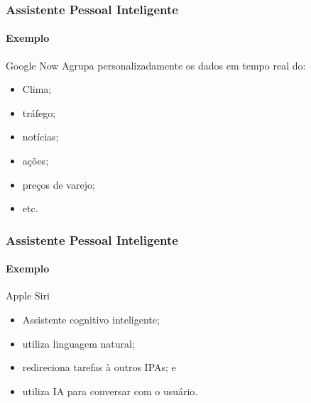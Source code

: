 \documentclass[14pt,beamer]{beamer}
\begin{document}
\begin{frame}
	\frametitle{Assistente Pessoal Inteligente}
    \framesubtitle{Exemplo}

    \begin{block}{Google Now}
        Agrupa personalizadamente os dados em tempo real do:
        \begin{itemize}
            \item Clima;
            \item tráfego;
            \item notícias;
            \item ações;
            \item preços de varejo;
            \item etc.
        \end{itemize}
    \end{block}
\end{frame}

\begin{frame}
	\frametitle{Assistente Pessoal Inteligente}
    \framesubtitle{Exemplo}

    \begin{block}{Apple Siri}
        \begin{itemize}
            \item Assistente cognitivo inteligente;
            \item utiliza linguagem natural;
            \item redireciona tarefas à outros IPAs; e
            \item utiliza IA para conversar com o usuário.
        \end{itemize}
    \end{block}
\end{frame}
\end{document}
